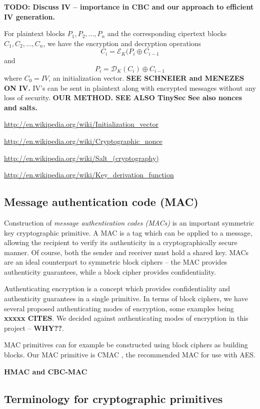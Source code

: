 
\textbf{TODO: Discuss IV -- importance in CBC and our approach to efficient IV generation.}

For plaintext blocks $P_1, P_2, \dots, P_n$ and the corresponding cipertext blocks $C_1, C_2, \dots, C_n$, we have the encryption and decryption operations
\[
C_i = \mathcal{E}_K(P_i \oplus C_{i-1}
\]
and 
\[
P_i = \mathcal{D}_K(C_i) \oplus C_{i-1}
\]
where $C_0=IV$, an initialization vector. \textbf{SEE SCHNEIER and MENEZES ON IV.}
%
IV's can be sent in plaintext along with encrypted messages without any loss of security. \textbf{OUR METHOD. SEE ALSO TinySec} \textbf{See also nonces and salts.}

\url{http://en.wikipedia.org/wiki/Initialization_vector}

\url{http://en.wikipedia.org/wiki/Cryptographic_nonce}

\url{http://en.wikipedia.org/wiki/Salt_(cryptography)}

\url{http://en.wikipedia.org/wiki/Key_derivation_function}

\subsection{Message authentication code (MAC)}

Construction of \textit{message authentication codes (MACs)} is an important symmetric key cryptographic primitive. A MAC is a tag which can be applied to a message, allowing the recipient to verify its authenticity in a cryptographically secure manner. Of course, both the sender and receiver must hold a shared key. MACs are an ideal counterpart to symmetric block ciphers -- the MAC provides authenticity guarantees, while a block cipher provides confidentiality.

Authenticating encryption is a concept which provides confidentiality and authenticity guarantees in a single primitive. In terms of block ciphers, we have several proposed authenticating modes of encryption, some examples being \textbf{xxxxx CITES}. We decided against authenticating modes of encryption in this project -- \textbf{WHY??}.

MAC primitives can for example be constructed using block ciphers as building blocks. Our MAC primitive is CMAC \cite{}, the recommended MAC for use with AES.

\textbf{HMAC and CBC-MAC}

\subsection{Terminology for cryptographic primitives}

